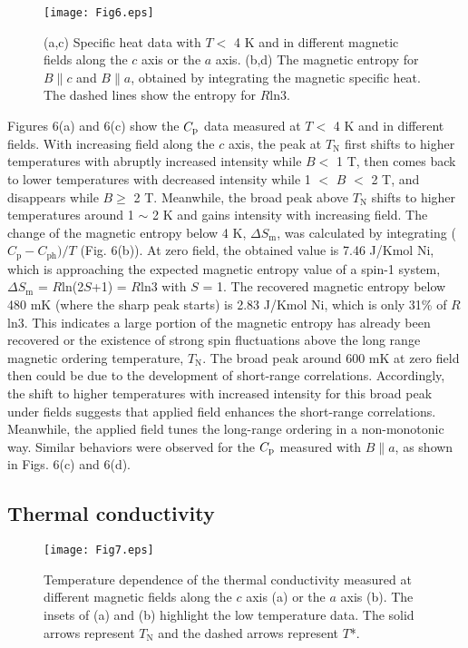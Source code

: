 \documentclass[aps,twocolumn,superscriptaddress,showpacs]{revtex4-1}
\begin{document}
\begin{figure}
\texttt{[image: Fig6.eps]}
\caption{(a,c) Specific heat data with $T <$ 4 K and in different magnetic fields along the $c$ axis or the $a$ axis. (b,d) The magnetic entropy for $B \parallel c$ and $B \parallel a$, obtained by integrating the magnetic specific heat. The dashed lines show the entropy for $R$ln3.}
\label{Cp2}
\end{figure}

Figures 6(a) and 6(c) show the $C\rm_{p}$ data measured at $T <$ 4 K and in different fields. With increasing field along the $c$ axis, the peak at $T_{\text{N}}$ first shifts to higher temperatures with abruptly increased intensity while $B < $ 1 T, then comes back to lower temperatures with decreased intensity while 1 $<$ $B$ $<$ 2 T, and disappears while $B \geq$ 2 T. Meanwhile, the broad peak above $T_{\text{N}}$ shifts to higher temperatures around 1 $\sim$ 2 K and gains intensity with increasing field. The change of the magnetic entropy below 4 K, $\Delta S_{\text{m}}$, was calculated by integrating ($C_{\text{p}} - C_{\text{ph}})/T$ (Fig. 6(b)). At zero field, the obtained value is 7.46 J/Kmol Ni, which is approaching the expected magnetic entropy value of a spin-1 system, $\Delta S_{\text{m}}$ = $R$ln(2$S$+1) = $R$ln3 with $S$ = 1. The recovered magnetic entropy below 480 mK (where the sharp peak starts) is 2.83 J/Kmol Ni, which is only 31\% of $R$ln3. This indicates a large portion of the magnetic entropy has already been recovered or the existence of strong spin fluctuations above the long range magnetic ordering temperature, $T_{\text{N}}$. The broad peak around 600 mK  at zero field then could be due to the development of short-range correlations. Accordingly, the shift to higher temperatures with increased intensity for this broad peak under fields suggests that applied field enhances the short-range correlations. Meanwhile, the applied field tunes the long-range ordering in a non-monotonic way. Similar behaviors were observed for the $C\rm_{p}$ measured with $B \parallel a$, as shown in Figs. 6(c) and 6(d).


\subsection{Thermal conductivity}

\begin{figure}
\texttt{[image: Fig7.eps]}
\caption{Temperature dependence of the thermal conductivity measured at different magnetic fields along the $c$ axis (a) or the $a$ axis (b). The insets of (a) and (b) highlight the low temperature data. The solid arrows represent $T_{\text{N}}$ and the dashed arrows represent $T$*.}
\label{kappaT}
\end{figure}
\end{document}
